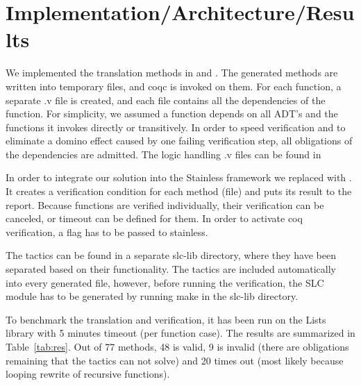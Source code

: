 \section{Implementation/Architecture/Results}

We implemented the translation methods in  and  . The generated methods are written into temporary files, and coqc is invoked on them. For each function, a separate .v file is created, and each file contains all the dependencies of the function. For simplicity, we assumed a function depends on all ADT's and the functions it invokes directly or transitively. In order to speed verification and to eliminate a domino effect caused by one failing verification step, all obligations of the dependencies are admitted. The logic handling .v files can be found in 

In order to integrate our solution into the Stainless framework we replaced  with . It creates a verification condition for each method (file) and puts its result to the report. Because functions are verified individually, their verification can be canceled, or timeout can be defined for them.
%
In order to activate coq verification, a  flag has to be passed to stainless.

The tactics can be found in a separate slc-lib directory, where they have been separated based on their functionality. The tactics are included automatically into every generated file, however, before running the verification, the SLC module has to be generated by running make in the slc-lib directory.

To benchmark the translation and verification, it has been run on the Lists library with 5 minutes timeout (per function case). The results are summarized in Table~\ref{tab:res}. Out of 77 methods, 48 is valid, 9 is invalid (there are obligations remaining that the tactics can not solve) and 20 times out (most likely because looping rewrite of recursive functions).

